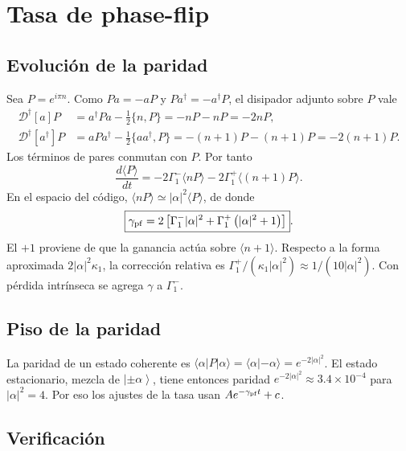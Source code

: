 \documentclass[11pt]{report}
\newcommand{\ket}[1]{\left|#1\right\rangle}
\newcommand{\D}{\mathcal{D}}
\begin{document}
\section{Tasa de phase-flip}
\label{sec:pf}

\subsection{Evoluci\'on de la paridad}

Sea $P=e^{i\pi n}$. Como $Pa=-aP$ y $Pa^{\dagger}=-a^{\dagger}P$, el disipador adjunto sobre $P$ vale
\begin{align}
\D^{\dagger}[a]P&=a^{\dagger}Pa-\tfrac12\{n,P\}=-nP-nP=-2nP,\\
\D^{\dagger}[a^{\dagger}]P&=aPa^{\dagger}-\tfrac12\{aa^{\dagger},P\}=-(n+1)P-(n+1)P=-2(n+1)P.
\end{align}
Los t\'erminos de pares conmutan con $P$. Por tanto
\begin{equation}
\frac{d\langle P\rangle}{dt}=-2\Gamma_{1}^{-}\langle nP\rangle-2\Gamma_{1}^{+}\langle(n+1)P\rangle.
\end{equation}
En el espacio del c\'odigo, $\langle nP\rangle\simeq|\alpha|^{2}\langle P\rangle$, de donde
\begin{equation}
\boxed{\gamma_{\rm pf}=2\left[\Gamma_{1}^{-}|\alpha|^{2}+\Gamma_{1}^{+}\left(|\alpha|^{2}+1\right)\right]}.
\end{equation}
El $+1$ proviene de que la ganancia act\'ua sobre $\langle n+1\rangle$. Respecto a la forma aproximada $2|\alpha|^{2}\kappa_{1}$, la correcci\'on relativa es $\Gamma_{1}^{+}/(\kappa_{1}|\alpha|^{2})\approx1/(10|\alpha|^{2})$. Con p\'erdida intr\'inseca se agrega $\gamma$ a $\Gamma_{1}^{-}$.

\subsection{Piso de la paridad}

La paridad de un estado coherente es $\langle\alpha|P|\alpha\rangle=\langle\alpha|{-\alpha}\rangle=e^{-2|\alpha|^{2}}$. El estado estacionario, mezcla de $\ket{\pm\alpha}$, tiene entonces paridad $e^{-2|\alpha|^{2}}\approx3.4\times10^{-4}$ para $|\alpha|^{2}=4$. Por eso los ajustes de la tasa usan $A e^{-\gamma_{\rm pf}t}+c$.

\subsection{Verificaci\'on}
\end{document}
